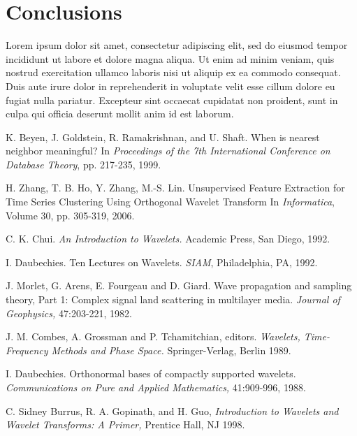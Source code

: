 \documentclass{article}
\begin{document}
\section{Conclusions}
Lorem ipsum dolor sit amet, consectetur adipiscing elit, sed do eiusmod tempor incididunt ut labore et dolore magna aliqua. Ut enim ad minim veniam, quis nostrud exercitation ullamco laboris nisi ut aliquip ex ea commodo consequat. Duis aute irure dolor in reprehenderit in voluptate velit esse cillum dolore eu fugiat nulla pariatur. Excepteur sint occaecat cupidatat non proident, sunt in culpa qui officia deserunt mollit anim id est laborum.


  \begin{thebibliography}{1}

 K. Beyen, J. Goldstein, R. Ramakrishnan, and U. Shaft. When is nearest neighbor meaningful? In {\em Proceedings of the 7th International Conference on Database Theory}, pp. 217-235, 1999.

 H. Zhang, T. B. Ho, Y. Zhang, M.-S. Lin. Unsupervised Feature Extraction for Time Series Clustering Using Orthogonal Wavelet Transform In {\em Informatica}, Volume 30, pp. 305-319, 2006.

 C. K. Chui. {\em An Introduction to Wavelets.} Academic Press, San Diego, 1992.

 I. Daubechies. Ten Lectures on Wavelets. {\em SIAM}, Philadelphia, PA, 1992.

 J. Morlet, G. Arens, E. Fourgeau and D. Giard. Wave propagation and sampling theory, Part 1: Complex  signal land scattering in multilayer media. {\em Journal of Geophysics,} 47:203-221, 1982.

 J. M. Combes, A. Grossman and P. Tchamitchian, editors. {\em Wavelets, Time-Frequency Methods and Phase Space.} Springer-Verlag, Berlin 1989.

 I. Daubechies. Orthonormal bases of compactly supported wavelets. {\em Communications on Pure and Applied Mathematics,} 41:909-996, 1988.

 C. Sidney Burrus, R. A. Gopinath, and H. Guo, {\em Introduction to Wavelets and Wavelet Transforms: A Primer,} Prentice Hall, NJ 1998.


\end{thebibliography}
\end{document}
